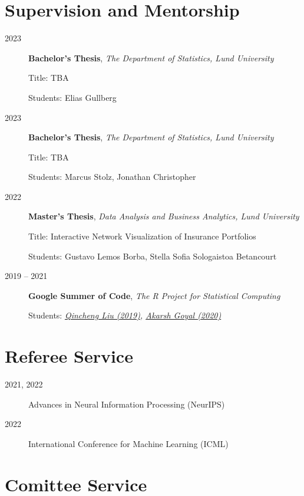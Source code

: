 \documentclass[english,a4paper]{article}
\renewcommand*{%
  \mkbibnamegiven
}[1]{\ifitemannotation{highlight}{\textbf{#1}}{#1}}
\renewcommand*{%
  \mkbibnamefamily
}[1]{\ifitemannotation{highlight}{\textbf{#1}}{#1}}
\begin{document}
\section{Supervision and Mentorship}

\begin{description}
  \item[2023] {
    \textbf{Bachelor's Thesis}, \emph{The Department of Statistics, Lund University}

    Title: TBA

    Students: Elias Gullberg
    }
  \item[2023] {
    \textbf{Bachelor's Thesis}, \emph{The Department of Statistics, Lund University}

    Title: TBA

    Students: Marcus Stolz, Jonathan Christopher
    }
  \item[2022] {
    \textbf{Master's Thesis}, \emph{Data Analysis and Business Analytics, Lund University}

    Title: Interactive Network Visualization of Insurance Portfolios

    Students: Gustavo Lemos Borba, Stella Sofia Sologaistoa Betancourt
    }
    \item[2019 -- 2021]{\textbf{Google Summer of Code}, \emph{The R Project for Statistical Computing}

                Students: \emph{\href{https://summerofcode.withgoogle.com/archive/2019/projects/4654960430546944}{Qincheng Liu (2019)}, \href{https://summerofcode.withgoogle.com/archive/2020/projects/5476086193848320}{Akarsh Goyal (2020)}}
          }
\end{description}

\section{Referee Service}

\begin{description}
  \item[2021, 2022]{Advances in Neural Information Processing (NeurIPS)}
  \item[2022]{International Conference for Machine Learning (ICML)}
\end{description}

\section{Comittee Service}
\end{document}
